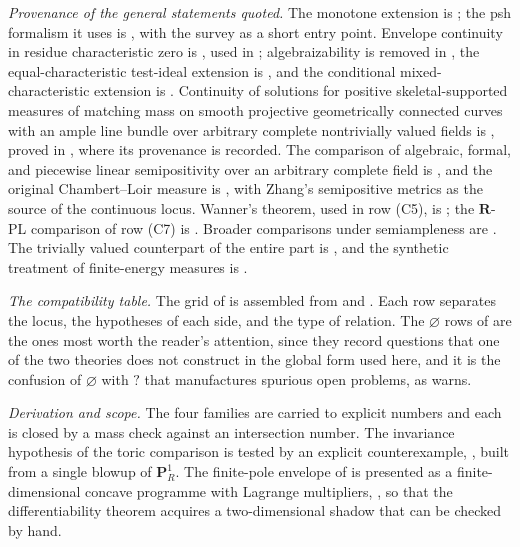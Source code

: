 \emph{Provenance of the general statements quoted.}  The monotone extension
 is \cite[Theorem~3.1]{BFJ15}; the psh
formalism it uses is \cite{BFJ16}, with the survey \cite{BFJ16b} as a short
entry point.  Envelope continuity in residue characteristic zero is
\cite[Theorem~8.3]{BFJ16}, used in \cite{BFJ15}; algebraizability is removed in \cite{BGGJKM20}, the
equal-characteristic test-ideal extension is \cite{GJKM19}, and the
conditional mixed-characteristic extension is \cite{FGK25}.  Continuity of
solutions for positive skeletal-supported measures of matching mass on
smooth projective geometrically connected curves with an ample line bundle
over arbitrary complete nontrivially valued fields is
, proved in
, where its provenance is recorded.  The
comparison of algebraic, formal, and
piecewise linear semipositivity over an arbitrary complete field is
\cite{GM19}, and the original Chambert--Loir measure is \cite{CL06}, with
Zhang's semipositive metrics \cite{Zhang1995} as the source of the
continuous locus.  Wanner's theorem, used in row (C5), is
\cite{Wanner19}; the $\mathbf R$-PL comparison of row (C7) is
\cite{GR25Classical,GR25PL}.  Broader comparisons under semiampleness are
\cite{BE21}.  The trivially valued counterpart of the entire part is
\cite{BJ22}, and the synthetic treatment of finite-energy measures is
\cite{BJ25FiniteEnergy}.

\emph{The compatibility table.}  The grid of  is assembled from
 and
.  Each row separates the locus, the
hypotheses of each side, and the type of relation.  The
$\varnothing$ rows of  are the ones most worth
the reader's attention, since they record questions that one of the two
theories does not construct in the global form used here, and it is the confusion of $\varnothing$ with
$?$ that manufactures spurious open problems, as
 warns.

\emph{Derivation and scope.}  The four families are carried to explicit
numbers and each is closed by a mass check against an intersection number.
The invariance hypothesis of the toric comparison is tested
by an explicit counterexample, , built from a
single blowup of $\mathbf P^1_R$.  The finite-pole envelope of
 is
presented as a finite-dimensional concave programme with Lagrange
multipliers, , so that the differentiability
theorem  acquires a
two-dimensional shadow that can be checked by hand.

